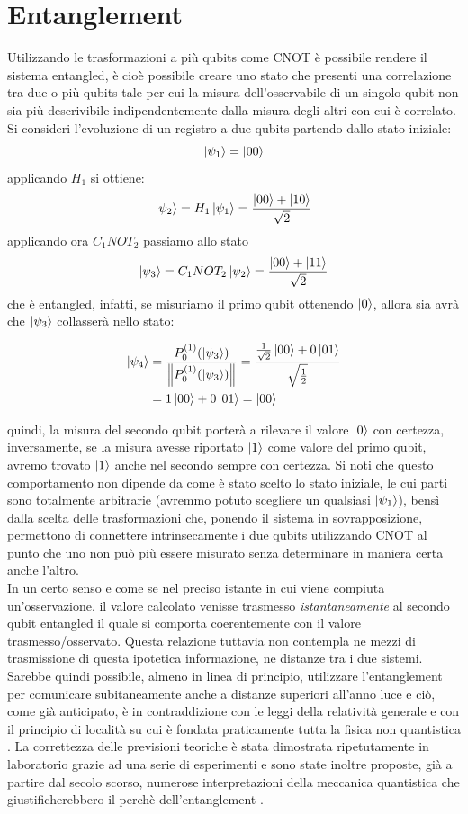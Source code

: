 \documentclass[12pt,a4paper,openright]{report}
\newcommand{\norm}[1]{\left\lVert#1\right\rVert}
\begin{document}
\section{Entanglement}
Utilizzando le trasformazioni a più qubits come CNOT è possibile rendere il sistema entangled, è cioè possibile creare uno stato che presenti una correlazione tra due o più qubits tale per cui la
misura dell'osservabile di un singolo qubit non sia più descrivibile indipendentemente dalla misura degli altri con cui è correlato.\\
Si consideri l'evoluzione di un registro a due qubits partendo dallo stato iniziale:    
\[
    \ket{\psi_1}= \ket{00}
\] 
applicando $H_1$ si ottiene:
\[
    \ket{\psi_2} = H_1\ket{\psi_1} = \frac{ \ket{00} + \ket{10} }{\sqrt2}
\]
applicando ora $C_1NOT_2$ passiamo allo stato 
\[
    \ket{\psi_3} = C_1NOT_2\ket{\psi_2} = \frac{ \ket{00} + \ket{11} }{\sqrt2}
\]
che è entangled, infatti, se misuriamo il primo qubit ottenendo $\ket0$, allora sia avrà che $\ket{\psi_3}$ collasserà nello stato:
\begin{center}
    \begin{align*}
        \ket{\psi_4} &= \frac{{P^{(1)}_0}(\ket{\psi_3}) }{ \norm{{P^{(1)}_0}(\ket{\psi_3})} } = \frac{  \frac{1}{\sqrt2}\ket{00} + 0\ket{01}  }{\sqrt{\frac{1}{2}}}\\*
        &=1\ket{00} + 0\ket{01} = \ket{00}
    \end{align*}
\end{center}
quindi, la misura del secondo qubit porterà a rilevare il valore $\ket0$ con certezza, inversamente, se la misura avesse riportato $\ket1$ come valore del primo qubit, avremo trovato $\ket1$ anche nel secondo
sempre con certezza. Si noti che questo comportamento non dipende da come è stato scelto lo stato iniziale, le cui parti sono totalmente arbitrarie (avremmo potuto scegliere un qualsiasi $\ket{\psi_1}$), bensì dalla scelta delle trasformazioni che,
ponendo il sistema in sovrapposizione, permettono di connettere intrinsecamente i due qubits utilizzando CNOT al punto che uno non può più essere misurato senza determinare in maniera certa
anche l'altro.\\
In un certo senso e come se nel preciso istante in cui viene compiuta un'osservazione, il valore calcolato venisse trasmesso \emph{istantaneamente} al secondo qubit entangled il quale si comporta coerentemente
con il valore trasmesso/osservato. Questa relazione tuttavia non contempla ne mezzi di trasmissione di questa ipotetica informazione, ne distanze tra i due sistemi. Sarebbe quindi possibile, almeno in linea di
principio, utilizzare l'entanglement per comunicare subitaneamente anche a distanze superiori all'anno luce e ciò, come già anticipato, è in contraddizione con le leggi della relatività generale e con il 
principio di località su cui è fondata praticamente tutta la fisica non quantistica \cite{ref9}. La correttezza delle previsioni teoriche è stata dimostrata ripetutamente in laboratorio grazie ad una serie
di esperimenti \cite{ref10} e sono state inoltre proposte, già a partire dal secolo scorso, numerose interpretazioni della meccanica quantistica che giustificherebbero il perchè dell'entanglement \cite{ref11}.
\end{document}
